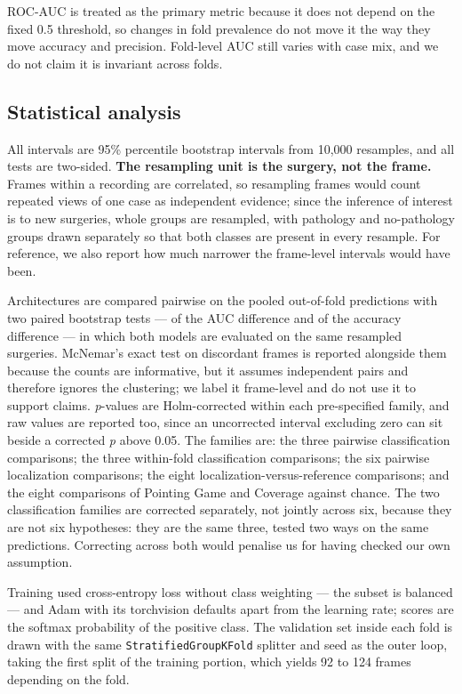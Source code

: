 \documentclass[preprint,12pt]{elsarticle}
\begin{document}
ROC-AUC is treated as the primary metric because it does not depend on the fixed 0.5 threshold, so changes in fold prevalence do not move it the way they move accuracy and precision. Fold-level AUC still varies with case mix, and we do not claim it is invariant across folds.

\subsection{Statistical analysis}
\label{sec:statistics}

All intervals are 95\% percentile bootstrap intervals from 10,000 resamples, and all tests are two-sided. \textbf{The resampling unit is the surgery, not the frame.} Frames within a recording are correlated, so resampling frames would count repeated views of one case as independent evidence; since the inference of interest is to new surgeries, whole groups are resampled, with pathology and no-pathology groups drawn separately so that both classes are present in every resample. For reference, we also report how much narrower the frame-level intervals would have been.

Architectures are compared pairwise on the pooled out-of-fold predictions with two paired bootstrap tests --- of the AUC difference and of the accuracy difference --- in which both models are evaluated on the same resampled surgeries. McNemar's exact test on discordant frames is reported alongside them because the counts are informative, but it assumes independent pairs and therefore ignores the clustering; we label it frame-level and do not use it to support claims. \emph{p}-values are Holm-corrected within each pre-specified family, and raw values are reported too, since an uncorrected interval excluding zero can sit beside a corrected \emph{p} above 0.05. The families are: the three pairwise classification comparisons; the three within-fold classification comparisons; the six pairwise localization comparisons; the eight localization-versus-reference comparisons; and the eight comparisons of Pointing Game and Coverage against chance. The two classification families are corrected separately, not jointly across six, because they are not six hypotheses: they are the same three, tested two ways on the same predictions. Correcting across both would penalise us for having checked our own assumption.

Training used cross-entropy loss without class weighting --- the subset is balanced --- and Adam with its torchvision defaults apart from the learning rate; scores are the softmax probability of the positive class. The validation set inside each fold is drawn with the same \texttt{StratifiedGroupKFold} splitter and seed as the outer loop, taking the first split of the training portion, which yields 92 to 124 frames depending on the fold.
\end{document}

